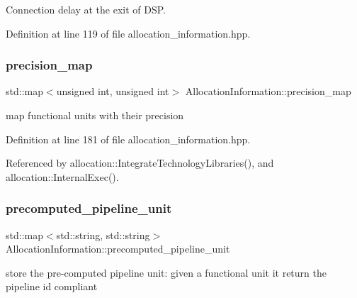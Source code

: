 Connection delay at the exit of D\+SP. 



Definition at line 119 of file allocation\+\_\+information.\+hpp.

\mbox{\label{classAllocationInformation_aa7d7d28f9c85cd5ce7b96e6ae111b31e}} 
\subsubsection{\texorpdfstring{precision\+\_\+map}{precision\_map}}
{\footnotesize\ttfamily std\+::map$<$unsigned int, unsigned int$>$ Allocation\+Information\+::precision\+\_\+map\hspace{0.3cm}{\ttfamily [private]}}



map functional units with their precision 



Definition at line 181 of file allocation\+\_\+information.\+hpp.



Referenced by allocation\+::\+Integrate\+Technology\+Libraries(), and allocation\+::\+Internal\+Exec().

\mbox{\label{classAllocationInformation_a2c6f950e765b8c39463d3fe03cdad3f3}} 
\subsubsection{\texorpdfstring{precomputed\+\_\+pipeline\+\_\+unit}{precomputed\_pipeline\_unit}}
{\footnotesize\ttfamily std\+::map$<$std\+::string, std\+::string$>$ Allocation\+Information\+::precomputed\+\_\+pipeline\+\_\+unit\hspace{0.3cm}{\ttfamily [private]}}



store the pre-\/computed pipeline unit\+: given a functional unit it return the pipeline id compliant 



